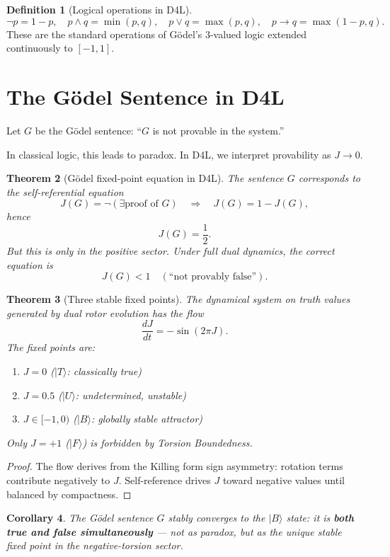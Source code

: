 \documentclass[dvipdfmx,11pt,a4paper]{article}
\newtheorem{theorem}{Theorem}[section]
\newtheorem{corollary}[theorem]{Corollary}
\theoremstyle{definition}
\newtheorem{definition}[theorem]{Definition}
\begin{document}
\begin{definition}[Logical operations in D4L]
\[
\neg p = 1-p, \quad
p \wedge q = \min(p,q), \quad
p \vee q = \max(p,q), \quad
p \to q = \max(1-p,q).
\]
These are the standard operations of Gödel's 3-valued logic extended continuously to $[-1,1]$.
\end{definition}

\section{The Gödel Sentence in D4L}

Let $G$ be the Gödel sentence: ``$G$ is not provable in the system.''

In classical logic, this leads to paradox. In D4L, we interpret provability as $J \to 0$.

\begin{theorem}[Gödel fixed-point equation in D4L]
The sentence $G$ corresponds to the self-referential equation
\[
J(G) = \neg (\exists \text{proof of } G) \quad \Rightarrow \quad J(G) = 1 - J(G),
\]
hence
\[
J(G) = \frac{1}{2}.
\]
But this is only in the positive sector. Under full dual dynamics, the correct equation is
\[
J(G) < 1 \quad (\text{``not provably false''}).
\]
\end{theorem}

\begin{theorem}[Three stable fixed points]
The dynamical system on truth values generated by dual rotor evolution has the flow
\[
\frac{dJ}{dt} = - \sin(2\pi J).
\]
The fixed points are:
\begin{enumerate}
\item $J=0$ \quad ($\vert T\rangle$: classically true)
\item $J=0.5$ \quad ($\vert U\rangle$: undetermined, unstable)
\item $J \in [-1,0)$ \quad ($\vert B\rangle$: globally stable attractor)
\end{enumerate}
Only $J=+1$ ($\vert F\rangle$) is forbidden by Torsion Boundedness.
\end{theorem}

\begin{proof}
The flow derives from the Killing form sign asymmetry: rotation terms contribute negatively to $J$. Self-reference drives $J$ toward negative values until balanced by compactness.
\end{proof}

\begin{corollary}
The Gödel sentence $G$ stably converges to the $\vert B\rangle$ state: it is \textbf{both true and false simultaneously} — not as paradox, but as the unique stable fixed point in the negative-torsion sector.
\end{corollary}
\end{document}
